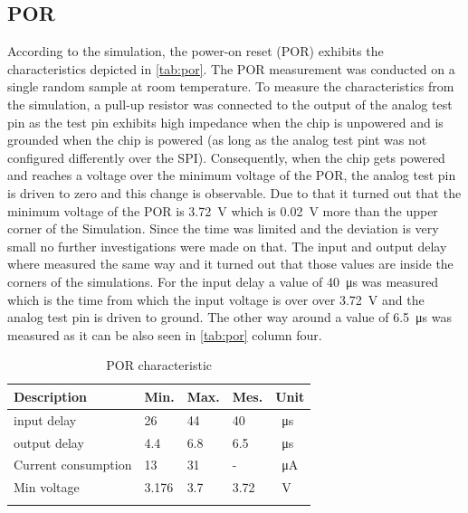\subsection{POR}
According to the simulation, the power-on reset (POR) exhibits the characteristics depicted in \autoref{tab:por}. The POR measurement was conducted on a single random sample at room temperature. To measure the characteristics from the simulation, a pull-up resistor was connected to the output of the analog test pin as the test pin exhibits high impedance when the chip is unpowered and is grounded when the chip is powered (as long as the analog test pint was not configured differently over the SPI).
Consequently, when the chip gets powered and reaches a voltage over the minimum voltage of the POR, the analog test pin is driven to zero and this change is observable. Due to that it turned out that the minimum voltage of the POR is \qty{3.72}{\volt} which is \qty{0.02}{\volt} more than the upper corner of the Simulation. Since the time was limited and the deviation is very small no further investigations were made on that. The input and output delay where measured the same way and it turned out that those values are inside the corners of the simulations. For the input delay a value of \qty{40}{\micro\second} was measured which is the time from which the input voltage is over over  \qty{3.72}{\volt} and the analog test pin is driven to ground. The other way around a value of \qty{6.5}{\micro\second} was measured as it can be also seen in \autoref{tab:por} column four.
\begin{longtable}{|p{2.5cm}|p{2.5cm}|p{2.5cm}|p{2.5cm}|p{2.5cm}|}
	\hline
	\rowcolor{lightgray}
	\textbf{Description} &\textbf{Min.} &\textbf{Max.} & \textbf{Mes.} & \textbf{Unit} \\ \hline
	
	input delay & 26 & 44 & 40  &\qty{}{\micro\second} \\ \hline
	output delay & 4.4 & 6.8 & 6.5 &\qty{}{\micro\second} \\ \hline
	Current consumption & 13 & 31 & -& \qty{}{\micro\ampere} \\ \hline
	Min voltage & 3.176& 3.7 & 3.72 & \qty{}{\volt} \\ \hline
	\caption{POR characteristic} %
	\label{tab:por}
\end{longtable}
